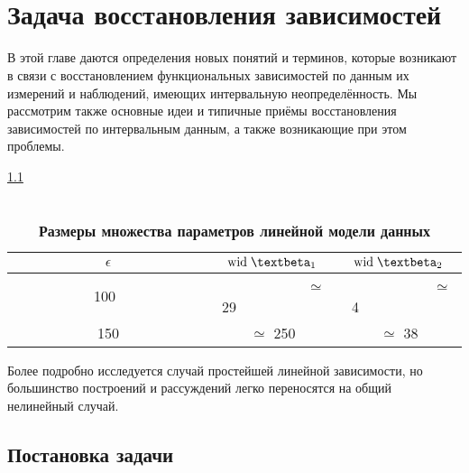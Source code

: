 \documentclass[a5paper,openany]{book}
\newcommand{\mbf}[1]{\protect\text{\boldmath$#1$}}
\newcommand{\w}{\mathrm{wid}\;}
\begin{document}

\chapter[Задача восстановления зависимостей]%
{\\Задача восстановления зависимостей} 
\label{FuncFitChap}


В этой главе даются определения новых понятий и терминов, которые возникают в связи 
с восстановлением функциональных зависимостей по данным их измерений и наблюдений, 
имеющих интервальную неопределённость. Мы рассмотрим также основные идеи и типичные 
приёмы восстановления зависимостей по интервальным данным, а также возникающие 
при этом проблемы. 


\begin{table}[h!]
	\TABLENAME \ref{TableWidbeta}
	\caption{\\ {\bfseries\small Размеры множества параметров линейной модели данных}}
	\label{TableWidbeta}
	\begin{center}
		\begin{tabular}{ | c | c | c | }
			\hline
			{\small	$\epsilon$} & {\small$\w \mbf{\beta}_1$} & {\small $\w \mbf{\beta}_2$} \\
			\hline
			~~~~~~~~~~~100~~~~~~~~~~~~	 & ~~~~~~~~~~~~$\simeq$ 29~~~~~~~~~~~~ & ~~~~~~~~~~~~$ \simeq$ 4~~~~~~~~~~~~ \\
			\hline				
			150	 & $\simeq$ 250 & $\simeq$ 38\\
			\hline
		\end{tabular}
	\end{center}
	\vspace{-4mm}
\end{table}


Более подробно исследуется случай простейшей линейной зависимости, 
но большинство построений и рассуждений легко переносятся на общий нелинейный случай. 

\section{Постановка задачи} 
\end{document}
